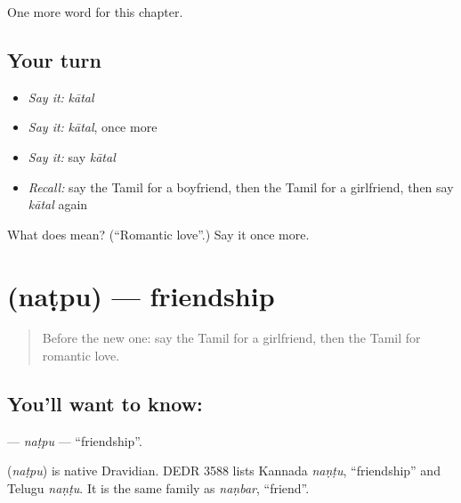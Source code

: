 \begin{grammarlens}[title={What you've built}]
One more word for this chapter.
\end{grammarlens}

\subsection*{Your turn}
\begin{itemize}
\raggedright
  \item \emph{Say it:} \emph{kātal}
  \item \emph{Say it:} \emph{kātal}, once more
  \item \emph{Say it:} say \emph{kātal}
  \item \emph{Recall:} say the Tamil for a boyfriend, then the Tamil for a girlfriend, then say \emph{kātal} again
\end{itemize}

\begin{tcolorbox}[breakable,colback=teal!4,colframe=teal!35!black,title={Before you move on}]
What does  mean? (\textquotedblleft{}Romantic love\textquotedblright{}.) Say it once more.
\end{tcolorbox}
\section[\texorpdfstring{\ta{நட்பு} (naṭpu)}{நட்பு (naṭpu)}]{ (naṭpu) — friendship}

\label{lesson:TA-C186-natpu}



\begin{quote}
Before the new one: say the Tamil for a girlfriend, then the Tamil for romantic love.
\end{quote}

\subsection*{You'll want to know: }
\textbf{} — \emph{naṭpu} — \textquotedblleft{}friendship\textquotedblright{}.

\begin{cousinweb}
\textbf{} (\emph{naṭpu}) is native Dravidian. DEDR 3588 lists Kannada \emph{naṇṭu}, \textquotedblleft{}friendship\textquotedblright{} and Telugu \emph{naṇṭu}. It is the same family as \emph{naṇbar}, \textquotedblleft{}friend\textquotedblright{}.
\end{cousinweb}

